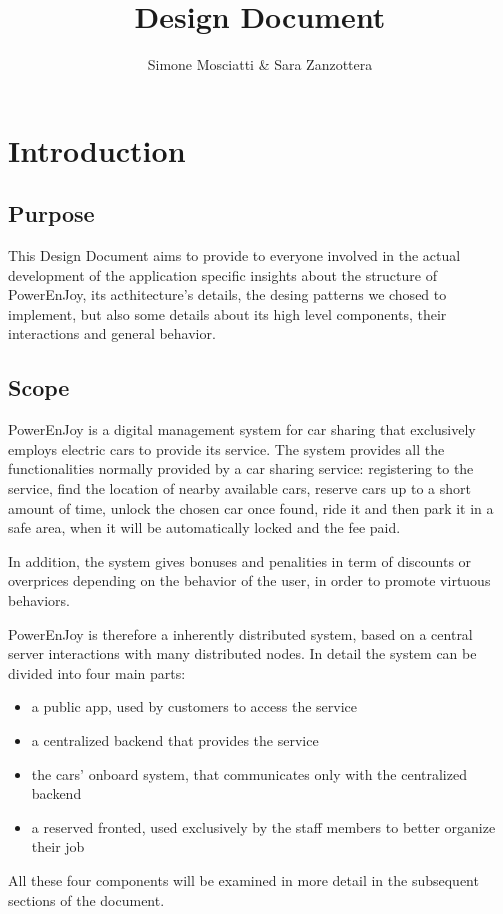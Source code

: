 \documentclass[11pt]{article} %
\title{Design Document}
\author{Simone Mosciatti \& Sara Zanzottera}
\newcommand{\pe}{PowerEnJoy }
\newcommand{\pecomma}{PowerEnJoy, }
\begin{document}
\maketitle
\newpage
\tableofcontents
\newpage


\section{Introduction}

\subsection{Purpose}

This Design Document aims to provide to everyone involved in the actual development of the application specific insights about the structure of \pecomma its acthitecture's details, the desing patterns we chosed to implement, but also some details about its high level components, their interactions and general behavior.

\subsection{Scope}

\pe is a digital management system for car sharing that exclusively employs electric cars to provide its service. The system provides all the functionalities normally provided by a car sharing service: registering to the service, find the location of nearby available cars, reserve cars up to a short amount of time, unlock the chosen car once found, ride it and then park it in a safe area, when it will be automatically locked and the fee paid.

In addition, the system gives bonuses and penalities in term of discounts or overprices depending on the behavior of the user, in order to promote virtuous behaviors.

\pe is therefore a inherently distributed system, based on a central server interactions with many distributed nodes. In detail the system can be divided into four main parts: 

\begin{itemize}[noitemsep]
	\item a public app, used by customers to access the service
	\item a centralized backend that provides the service
	\item the cars' onboard system, that communicates only with the centralized backend
	\item a reserved fronted, used exclusively by the staff members to better organize their job
\end{itemize}
All these four components will be examined in more detail in the subsequent sections of the document.
\end{document}
